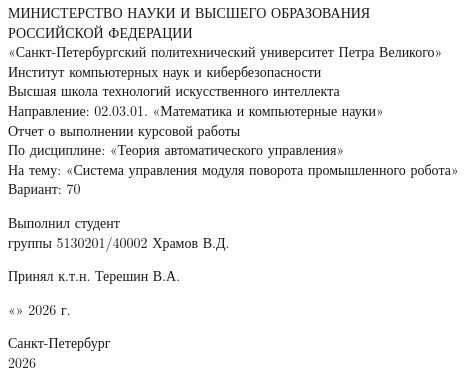 \documentclass[a4paper, 14pt]{extarticle}
\begin{document}
\begin{titlepage}
    \thispagestyle{empty}
    \begin{center}
        { \large МИНИСТЕРСТВО НАУКИ И ВЫСШЕГО ОБРАЗОВАНИЯ \\
            РОССИЙСКОЙ ФЕДЕРАЦИИ \\ }
        { «Санкт-Петербургский политехнический университет Петра Великого» \\}
        { Институт компьютерных наук и кибербезопасности \\
            Высшая школа технологий искусственного интеллекта \\
            Направление: 02.03.01. «Математика и компьютерные науки» \\ }
        \vspace{3cm}
        { \large Отчет о выполнении курсовой работы \\
            По дисциплине: «Теория автоматического управления» \\
            На тему: «Система управления модуля поворота промышленного робота» \\
            Вариант: 70}
    \end{center}
    \vspace{3cm}
    \begin{center}
        \noindent
        \begin{minipage}[t]{\textwidth}
            \raggedright Выполнил студент \\ группы 5130201/40002 \hfill
            \underline{\hspace{3cm}} Храмов В.Д.
        \end{minipage}
        \vspace{1cm}

        \noindent
        \begin{minipage}[t]{\textwidth}
            \raggedright Принял к.т.н. \hfill
            \underline{\hspace{3cm}}  Терешин В.А.
        \end{minipage}
    \end{center}
    \vspace{1cm}
    \begin{flushright}
        \large
        «\underline{\hspace{1cm}}» \underline{\hspace{3cm}} 2026 г.
    \end{flushright}
    \vspace{0.5cm}
    \vfill
    \begin{center}
        Санкт-Петербург \\
        2026
    \end{center}
\end{titlepage}
\setcounter{page}{2}
\newpage
\tableofcontents
\newpage
\end{document}
